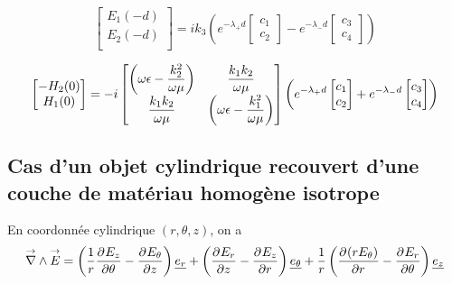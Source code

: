 \begin{equation}
    \begin{bmatrix}
        E_1(-d)\\
        E_2(-d)\\
    \end{bmatrix}
    = ik_3\left( e^{-\lambda_+ d}
    \begin{bmatrix}
        c_1\\
        c_2
    \end{bmatrix}
    - e^{-\lambda_- d}
    \begin{bmatrix}
        c_3 \\
        c_4 
    \end{bmatrix}
    \right)
\end{equation}

\begin{multline}
    \begin{bmatrix}
        -H_2(0)\\
        H_1(0)\\
    \end{bmatrix}
    =
    -i\begin{bmatrix}
        \left(\w\eps-\frac{k_2^2}{\w\mu}\right)& \frac{k_1k_2}{\w\mu} \\
        \frac{k_1k_2}{\w\mu}& \left(\w\eps-\frac{k_1^2}{\w\mu}\right) \\
    \end{bmatrix}
    \left(
    e^{-\lambda_+ d} 
        \begin{bmatrix}
        c_1\\
        c_2
    \end{bmatrix} + 
    e^{-\lambda_- d}
    \begin{bmatrix}
        c_3 \\
        c_4 \\
    \end{bmatrix}
    \right)
\end{multline}


\subsection{Cas d'un objet cylindrique recouvert d'une couche de matériau homogène isotrope}

En coordonnée cylindrique $(r,\theta,z)$, on a
\begin{equation}
\vrot \vE = \left(\frac{1}{r}\ddr{\theta}{E_z} - \ddr{z}{E_\theta}\right)\v{e_r} + 
\left(\ddr{z}{E_r} - \ddr{r}{E_z}\right)\v{e_\theta} +
\frac{1}{r}\left(\ddr{r}{(rE_\theta)}-\ddr{\theta}{E_r}\right)\v{e_z}
\end{equation}

